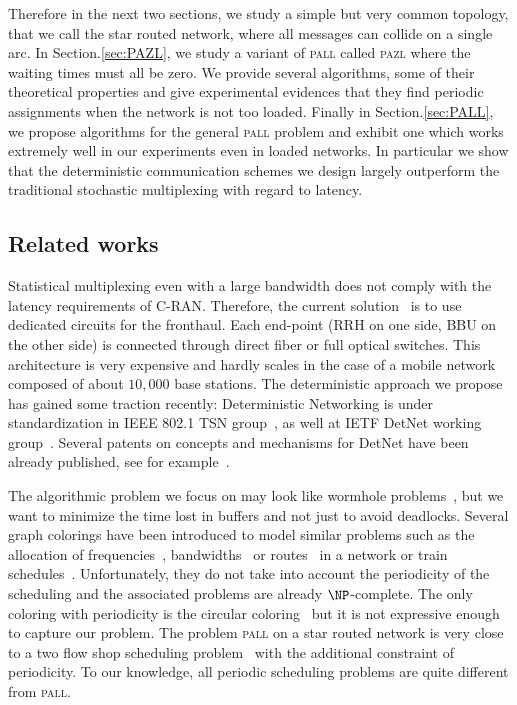 \documentclass[10pt, conference, letterpaper]{IEEEtran}
\newcommand\pazl{\textsc{pazl}\xspace}
\newcommand\pall{\textsc{pall}\xspace}
\begin{document}
Therefore in the next two sections, we study a simple but very common topology, that we call the
star routed network, where all messages can collide on a single arc.
In Section.\ref{sec:PAZL}, we study a variant of \pall called \pazl  where the waiting times must all be zero. We provide several algorithms, some of their theoretical properties and give experimental evidences that they find periodic assignments when the network is not too loaded. Finally in Section.\ref{sec:PALL}, we propose algorithms for the general \pall problem and exhibit one which works extremely well in our experiments even in loaded networks. In particular we show that the deterministic communication schemes we design largely outperform the traditional stochastic multiplexing with regard to latency. 
 \subsection*{Related works}

 Statistical multiplexing even with a large bandwidth does not comply with the latency requirements of C-RAN. Therefore, the current solution~\cite{pizzinat2015things,tayq2017real} is to use dedicated circuits for the fronthaul. Each end-point (RRH on one side, BBU on the other side) is connected through direct fiber or full optical switches. This architecture is very expensive and hardly scales in the case of a mobile network composed of about $10,000$ base stations. The deterministic approach we propose has gained some traction recently: Deterministic Networking is under standardization in IEEE 802.1 TSN group~\cite{finn-detnet-architecture-08}, as well at IETF DetNet working group~\cite{ieee802}. Several patents on concepts and mechanisms for DetNet have been already published, see for example~\cite{howe2005time,leclerc2016transmission}. 
     
The algorithmic problem we focus on may look like wormhole problems~\cite{cole1996benefit}, but we want to minimize the time lost in buffers and not just to avoid deadlocks. Several graph colorings have been introduced to model similar problems such as the allocation of frequencies~\cite{borndorfer1998frequency}, bandwidths~\cite{erlebach2001complexity} or routes~\cite{cole1996benefit} in a network or train schedules~\cite{strotmann2007railway}. Unfortunately, they do not take into account the periodicity of the scheduling and the associated problems are already $\NP$-complete. The only coloring with periodicity is the circular coloring~\cite{zhou2013multiple} but it is not expressive enough to capture our problem. 
The problem \pall on a star routed network is very close to a two flow shop scheduling problem~\cite{yu2004minimizing}
with the additional constraint of periodicity. To our knowledge, all periodic scheduling problems are quite different from \pall.
\end{document}
